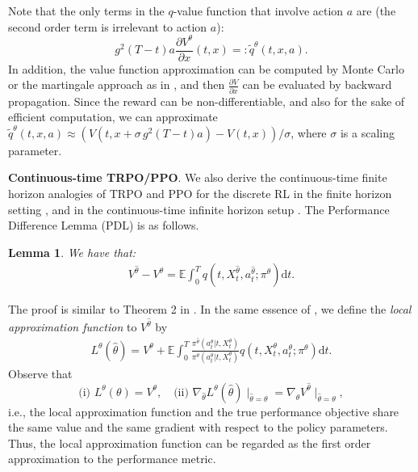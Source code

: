 \documentclass{article}
\theoremstyle{plain}
\newtheorem{lemma}[theorem]{Lemma}
\theoremstyle{definition}
\theoremstyle{remark}
\begin{document}
Note that the only terms in the $q$-value function that involve action $a$ are (the second order term is irrelevant to action $a$):
$$
g^2(T-t) a \frac{\partial V^{\theta}}{\partial x}(t,x) =: \tilde{q}^{\theta}(t,x,a).
$$
In addition, the value function approximation can be computed by Monte Carlo or the martingale approach as in \citet{jia2022policy_evaluation}, and then $\frac{\partial V}{\partial x}$ can be evaluated by backward propagation. Since the reward can be non-differentiable, and also for the sake of efficient computation, 
we can approximate $\tilde{q}^{\theta}(t,x,a)\approx \left(V(t, x+\sigma\, g^2(T-t) a)-V(t, x)\right)/\sigma$, where $\sigma$ is a scaling parameter. 

\textbf{Continuous-time TRPO/PPO}. We also derive the continuous-time finite horizon analogies of TRPO and PPO for the discrete RL in the finite horizon setting \cite{schulman2015trust,schulman2017proximal}, and in the continuous-time infinite horizon setup \cite{zhao2024policy}. 
The Performance Difference Lemma (PDL) is as follows.
\begin{lemma}
\label{lem:Continuous-time PDL}
We have that:
\begin{eqnarray}
\label{eqn: CT PDL}
V^{\hat{\theta}} - V^{\theta} =\mathbb{E}\int _ { 0 } ^ { T } q(t, X_t^{\hat{\theta}}, a_t^{\hat{\theta}} ; \pi^{\theta})\mathrm{d} t.
\end{eqnarray}
\end{lemma}
\vspace{-5 pt}
The proof is similar to Theorem 2 in \cite{zhao2024policy}. In the same essence of \cite{KakadeL02, schulman2015trust,zhao2024policy}, we define the {\em local approximation function} to $V^{\hat{\theta}}$ by
\begin{eqnarray}
\label{TRPO objective cont integral}
	L^{\theta}(\hat{\theta})=V^{\theta}+\mathbb{E}\int _ { 0 } ^ { T } \frac{\pi^ { \hat{\theta}}( a _ { t } ^ {\theta} | t , X _ { t } ^ {\theta} )}{\pi^ { \theta}( a _ { t } ^ {\theta} | t , X _ { t } ^ {\theta} )} q(t, X_t^{\theta}, a_t^{\theta} ; \pi^\theta)\mathrm{d} t.
\end{eqnarray}
Observe that
$$\text{(i) }L^{\theta}(\theta)=V^{\theta}, \quad\text{(ii) }\nabla_{\hat{\theta}}L^{\theta}(\hat{\theta})\mid_{\hat{\theta}=\theta}=\nabla_{\hat{\theta}}V^{\hat{\theta}}\mid_{\hat{\theta}=\theta},$$ 
i.e., the local approximation function and the true performance objective share the same value and the same gradient with respect to the policy parameters.
Thus, the local approximation function can be regarded as the first order approximation to the performance metric.
\end{document}
